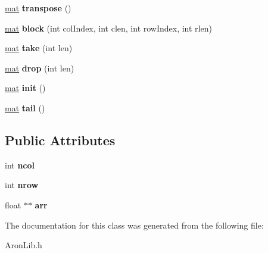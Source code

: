 \begin{DoxyCompactItemize}
\mbox{\label{class_matrix_vector_1_1mat_abe8ff1f6f29fe9e406b755c3f655dd18}} 
\mbox{\hyperlink{class_matrix_vector_1_1mat}{mat}} {\bfseries transpose} ()
\item 
\mbox{\label{class_matrix_vector_1_1mat_aa623e369c2af8582646a44d0c7614db0}} 
\mbox{\hyperlink{class_matrix_vector_1_1mat}{mat}} {\bfseries block} (int col\+Index, int clen, int row\+Index, int rlen)
\item 
\mbox{\label{class_matrix_vector_1_1mat_a24f0cefca0d6f79545c2f130fda0b82c}} 
\mbox{\hyperlink{class_matrix_vector_1_1mat}{mat}} {\bfseries take} (int len)
\item 
\mbox{\label{class_matrix_vector_1_1mat_a7cd7e57bf6907ee80445afdb462fd095}} 
\mbox{\hyperlink{class_matrix_vector_1_1mat}{mat}} {\bfseries drop} (int len)
\item 
\mbox{\label{class_matrix_vector_1_1mat_a96ad31de366c370206569f0be9e1de5e}} 
\mbox{\hyperlink{class_matrix_vector_1_1mat}{mat}} {\bfseries init} ()
\item 
\mbox{\label{class_matrix_vector_1_1mat_a81893c6dae060972bce5ff67c7a07ee9}} 
\mbox{\hyperlink{class_matrix_vector_1_1mat}{mat}} {\bfseries tail} ()
\end{DoxyCompactItemize}
\subsection*{Public Attributes}
\begin{DoxyCompactItemize}
\item 
\mbox{\label{class_matrix_vector_1_1mat_a592d970921c2d031bf648d70e5f448dc}} 
int {\bfseries ncol}
\item 
\mbox{\label{class_matrix_vector_1_1mat_af448f5d4ef6da3b9c6d72870f690695d}} 
int {\bfseries nrow}
\item 
\mbox{\label{class_matrix_vector_1_1mat_a5f1dd191eaa81d863fd0c2a546cf7e67}} 
float $\ast$$\ast$ {\bfseries arr}
\end{DoxyCompactItemize}


The documentation for this class was generated from the following file\+:\begin{DoxyCompactItemize}
\item 
Aron\+Lib.\+h\end{DoxyCompactItemize}
